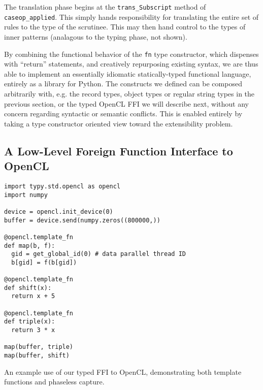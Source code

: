\documentclass{sigplanconf}
\newcommand{\lip}[1]{\lstinline[language=Python,basicstyle=\ttfamily\small,deletendkeywords={tuple,buffer,map}]{#1}}
\begin{document}
The translation phase begins at the \lip{trans_Subscript} method of \lip{caseop_applied}. This simply hands responsibility for translating the entire set of rules to the type of the scrutinee. This may then hand control to the types of inner patterns (analagous to the typing phase, not shown). 

By combining the functional behavior of the \lip{fn} type constructor, which dispenses with ``return'' statements, and creatively repurposing existing syntax, we are thus able to implement an essentially idiomatic statically-typed functional language, entirely as a library for Python. The constructs we defined can be composed arbitrarily with, e.g. the record types, object types or regular string types in the previous section, or the typed OpenCL FFI we will describe next, without any concern regarding syntactic or semantic conflicts. This is enabled entirely by taking a type constructor oriented view toward the extensibility problem. 

\subsection{A Low-Level Foreign Function Interface to OpenCL} 

\begin{codelisting}[t]
\begin{lstlisting}
import typy.std.opencl as opencl
import numpy

device = opencl.init_device(0)
buffer = device.send(numpy.zeros((800000,))

@opencl.template_fn
def map(b, f):
  gid = get_global_id(0) # data parallel thread ID
  b[gid] = f(b[gid])

@opencl.template_fn
def shift(x):
  return x + 5

@opencl.template_fn
def triple(x):
  return 3 * x

map(buffer, triple)
map(buffer, shift)
\end{lstlisting}
\caption{An example use of our typed FFI to OpenCL, demonstrating both template functions and phaseless capture.}
\label{example-opencl}
\end{codelisting}
\end{document}
